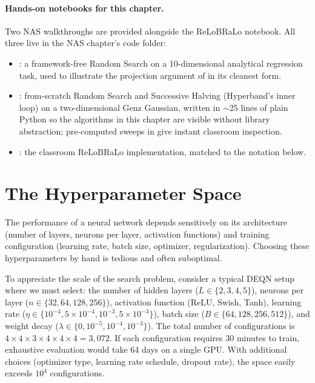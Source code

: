 \documentclass[11pt,a4paper]{report}
\begin{document}
\paragraph{Hands-on notebooks for this chapter.}
Two NAS walkthroughs are provided alongside the ReLoBRaLo notebook.  All three live in the NAS chapter's code folder:
\begin{itemize}
    \item {}: a framework-free Random Search on a 10-dimensional analytical regression task, used to illustrate the projection argument of \citet{bergstra2012random} in its cleanest form.
    \item {}: from-scratch Random Search and Successive Halving (Hyperband's inner loop) on a two-dimensional Genz Gaussian, written in $\sim$25 lines of plain Python so the algorithms in this chapter are visible without library abstraction; pre-computed sweeps in  give instant classroom inspection.
    \item {}: the classroom ReLoBRaLo implementation, matched to the notation below.
\end{itemize}

\section{The Hyperparameter Space}

The performance of a neural network depends sensitively on its architecture (number of layers, neurons per layer, activation functions) and training configuration (learning rate, batch size, optimizer, regularization).  Choosing these hyperparameters by hand is tedious and often suboptimal.

To appreciate the scale of the search problem, consider a typical DEQN setup where we must select: the number of hidden layers ($L \in \{2, 3, 4, 5\}$), neurons per layer ($n \in \{32, 64, 128, 256\}$), activation function (ReLU, Swish, Tanh), learning rate ($\eta \in \{10^{-4}, 5\times 10^{-4}, 10^{-3}, 5\times 10^{-3}\}$), batch size ($B \in \{64, 128, 256, 512\}$), and weight decay ($\lambda \in \{0, 10^{-5}, 10^{-4}, 10^{-3}\}$).  The total number of configurations is $4 \times 4 \times 3 \times 4 \times 4 \times 4 = 3{,}072$.  If each configuration requires 30 minutes to train, exhaustive evaluation would take 64 days on a single GPU.  With additional choices (optimizer type, learning rate schedule, dropout rate), the space easily exceeds $10^4$ configurations.
\end{document}
